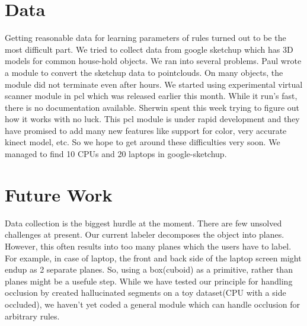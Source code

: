 \documentclass[11pt]{article} %
\begin{document}
\section{Data}
Getting reasonable data for learning parameters of rules turned out to be the most difficult part. We tried to collect data from google sketchup which has 3D models for common house-hold objects. We ran into several problems. Paul wrote a module to convert the sketchup data to pointclouds. On many objects, the module did not terminate even after hours. We started using experimental virtual scanner module in pcl which was released earlier this month. While it run's fast, there is no documentation available. Sherwin spent this week trying to figure out how it works with no luck. This pcl module is under rapid development and they have promised to add many new features like support for color, very accurate kinect model, etc. So we hope to get around these difficulties very soon. We managed to find 10 CPUs and 20 laptops in google-sketchup. \\


\section{Future Work}
Data collection is the biggest hurdle at the moment. There are few unsolved challenges at present.  Our current labeler decomposes the object into planes. However, this often results into too many planes which the users have to label. For example, in case of laptop, the front and back side of the laptop screen might endup as 2 separate planes. So, using a box(cuboid) as a primitive, rather than planes might be a usefule step. While we have tested our principle for handling occlusion by created hallucinated segments on a toy dataset(CPU with a side occluded), we haven't yet coded a general module which can handle occlusion for arbitrary rules.


{  


}
\end{document}

